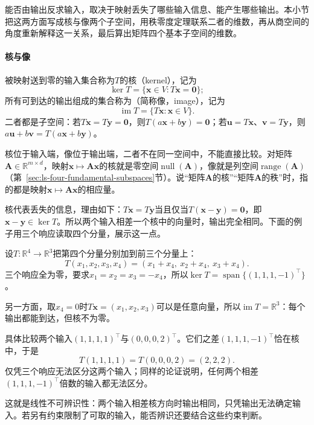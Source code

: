 能否由输出反求输入，取决于映射丢失了哪些输入信息、能产生哪些输出。本小节把这两方面写成核与像两个子空间，用秩零度定理联系二者的维数，再从商空间的角度重新解释这一关系，最后算出矩阵四个基本子空间的维数。

\paragraph{核与像}
被映射送到零的输入集合称为$T$的核（kernel），记为
\[
 \ker T=\{\bm x\in V:T\bm x=\bm0\};
\]
所有可到达的输出组成的集合称为（简称像，image），记为
\[
 \operatorname{im}T=\{T\bm x:\bm x\in V\}.
\]
二者都是子空间：若$T\bm x=T\bm y=\bm0$，则$T(a\bm x+b\bm y)=\bm0$；若$\bm u=T\bm x$、$\bm v=T\bm y$，则$a\bm u+b\bm v=T(a\bm x+b\bm y)$。

核位于输入端，像位于输出端，二者不在同一空间中，不能直接比较。对矩阵$\bm A\in\mathbb R^{m\times d}$，映射$\bm x\mapsto\bm A\bm x$的核就是零空间$\operatorname{null}(\bm A)$，像就是列空间$\operatorname{range}(\bm A)$（第~\ref{sec:ls-four-fundamental-subspaces}节）。说“矩阵$\bm A$的核”“矩阵$\bm A$的秩”时，指的都是映射$\bm x\mapsto\bm A\bm x$的相应量。

核代表丢失的信息，理由如下：$T\bm x=T\bm y$当且仅当$T(\bm x-\bm y)=\bm0$，即$\bm x-\bm y\in\ker T$。所以两个输入相差一个核中的向量时，输出完全相同。下面的例子用三个响应读取四个分量，展示这一点。
\begin{example}[相差核方向的输入给出相同输出]
\label{ex:ls-kernel-indistinguishable}
设$T:\mathbb R^4\to\mathbb R^3$把第四个分量分别加到前三个分量上：
\[
 T(x_1,x_2,x_3,x_4)=(x_1+x_4,\ x_2+x_4,\ x_3+x_4).
\]
三个响应全为零，要求$x_1=x_2=x_3=-x_4$，所以$\ker T=\operatorname{span}\{(1,1,1,-1)^{\top}\}$。

另一方面，取$x_4=0$时$T\bm x=(x_1,x_2,x_3)$可以是任意向量，所以$\operatorname{im}T=\mathbb R^3$：每个输出都能到达，但核不为零。

具体比较两个输入$(1,1,1,1)^\top$与$(0,0,0,2)^\top$。它们之差$(1,1,1,-1)^\top$恰在核中，于是
\[
 T(1,1,1,1)=T(0,0,0,2)=(2,2,2).
\]
仅凭三个响应无法区分这两个输入；同样的论证说明，任何两个相差$(1,1,1,-1)^\top$倍数的输入都无法区分。
\end{example}
这就是线性不可辨识性：两个输入相差核方向时输出相同，只凭输出无法确定输入。若另有约束限制了可取的输入，能否辨识还要结合这些约束判断。

